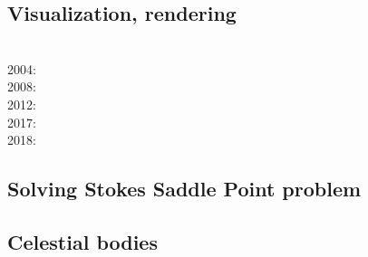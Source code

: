 \subsection{Visualization, rendering}

\begin{scriptsize}
\cite{faha}\\
2004: \cite{rugy04}\\
2008: \cite{chzy08}\cite{stmt08}\cite{bikh08}\\
2012: \cite{may12}\\
2017: \cite{krke17}\\
2018: \cite{cram18}
\end{scriptsize}

\subsection{Solving Stokes Saddle Point problem}

\begin{scriptsize}
\cite{laqu86}
\cite{rotf90}
\cite{frha93}
\cite{elgo94}
\cite{cheb96}\cite{elma96}
\cite{brpv97}
\cite{lixu01}
\cite{dogs06}\cite{lica06}
\cite{hoow17}
\end{scriptsize}

\subsection{Celestial bodies}

